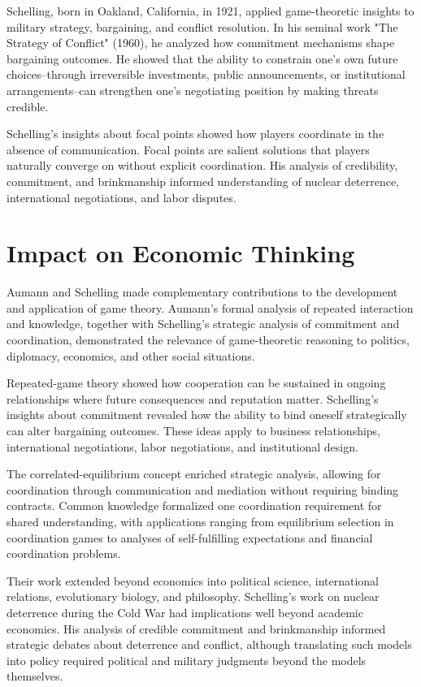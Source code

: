 Schelling, born in Oakland, California, in 1921, applied game-theoretic insights to
military strategy, bargaining, and conflict resolution. In his seminal work
"The Strategy of Conflict" (1960), he analyzed how commitment mechanisms
shape bargaining outcomes. He showed that the ability to constrain one's
own future choices--through irreversible investments, public announcements,
or institutional arrangements--can strengthen one's negotiating position
by making threats credible.

Schelling's insights about focal points showed how players coordinate in
the absence of communication. Focal points are salient solutions that
players naturally converge on without explicit coordination. His analysis
of credibility, commitment, and brinkmanship informed understanding of
nuclear deterrence, international negotiations, and labor disputes.

\section{Impact on Economic Thinking}
Aumann and Schelling made complementary contributions to the development and
application of game theory. Aumann's formal analysis of repeated interaction and
knowledge, together with Schelling's strategic analysis of commitment and
coordination, demonstrated the relevance of game-theoretic reasoning to politics,
diplomacy, economics, and other social situations.

Repeated-game theory showed how cooperation can be sustained in ongoing
relationships where future consequences and reputation matter. Schelling's
insights about commitment revealed how the ability to bind oneself strategically
can alter bargaining outcomes. These ideas apply to business relationships,
international negotiations, labor negotiations, and institutional design.

The correlated-equilibrium concept enriched strategic analysis, allowing for
coordination through communication and mediation without requiring binding
contracts. Common knowledge formalized one coordination requirement for shared
understanding, with applications ranging from equilibrium selection in
coordination games to analyses of self-fulfilling expectations and financial
coordination problems.

Their work extended beyond economics into political science, international
relations, evolutionary biology, and philosophy. Schelling's work on nuclear
deterrence during the Cold War had implications well beyond academic economics.
His analysis of credible commitment and brinkmanship informed strategic debates
about deterrence and conflict, although translating such models into policy
required political and military judgments beyond the models themselves.

